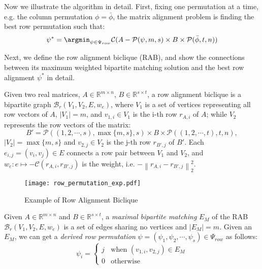 \documentclass[conference]{IEEEtran}
\begin{document}
{Now we illustrate the algorithm in detail. First, fixing one permutation at a time, e.g. the column permutation $\phi = \bar \phi$, the matrix alignment problem is finding the best row permutation such that: 
\begin{displaymath}
\psi^* = \argmin_{\psi \in \Psi_{row}} \mathcal{C}(A - \mathcal{P}(\psi,m,s)\times B \times \mathcal{P}(\bar \phi,t,n))
\end{displaymath}


Next, we define the row alignment biclique (RAB), and show the connections between its maximum weighted bipartite matching solution and the best row alignment $\psi^*$ in detail. 


\begin{definition} 
Given two real matrices, $A \in \mathbb{R}^{m\times n}$, $B \in \mathbb{R}^{s \times t}$, a row alignment biclique is a bipartite graph $\mathcal{B}_r(V_1, V_2, E, w_e)$, where $V_1$ is a set of vertices representing all row vectors of $A$, $|V_1| = m$, and $v_{1,i} \in V_1$ is the i-{th} row $r_{A,i}$ of $A$; while $V_2$ represents the row vectors of the matrix:
\begin{displaymath}
B' = \mathcal{P}((1,2,\cdots,s), \max\{m,s\}, s)\times B\times \mathcal{P}((1,2,\cdots,t), t,n),
\end{displaymath}
$|V_2| = \max\{m,s\}$ and $v_{2,j} \in V_2$ is the j-{th} row $r_{B',j}$ of $B'$. Each $e_{i,j} = (v_i, v_j) \in E$ connects a row pair between $V_1$ and $V_2$, and $w_e: e \mapsto - \mathcal{C}(r_{A,i}, r_{B',j})$ is the weight, i.e. $- \left\|r_{A,i} - r_{B',j}\right\|_2^2$. 
\end{definition}


\begin{figure}[h!]
\centering
\texttt{[image: row\_permutation\_exp.pdf]}
\caption{Example of Row Alignment Biclique}
\label{fig:row_permutation_exp}
\end{figure}


Given $A \in \mathbb{R}^{m\times n}$ and $B \in \mathbb{R}^{s\times t}$, a \emph{maximal bipartite matching} $E_M$ of the RAB $\mathcal{B}_r(V_1, V_2, E, w_e)$ is a set of edges sharing no vertices and $|E_M| = m$. Given an $E_M$, we can get a \emph{derived row permutation} $\psi = (\psi_1, \psi_2, \cdots, \psi_s) \in \Psi_{row}$ as follows:
\begin{displaymath}
\psi_i = \begin{cases}
j &\text{when\ } (v_{1,i}, v_{2,j}) \in E_M\\
0 &\text{otherwise} %
\end{cases}
\end{displaymath}


}
\end{document}
